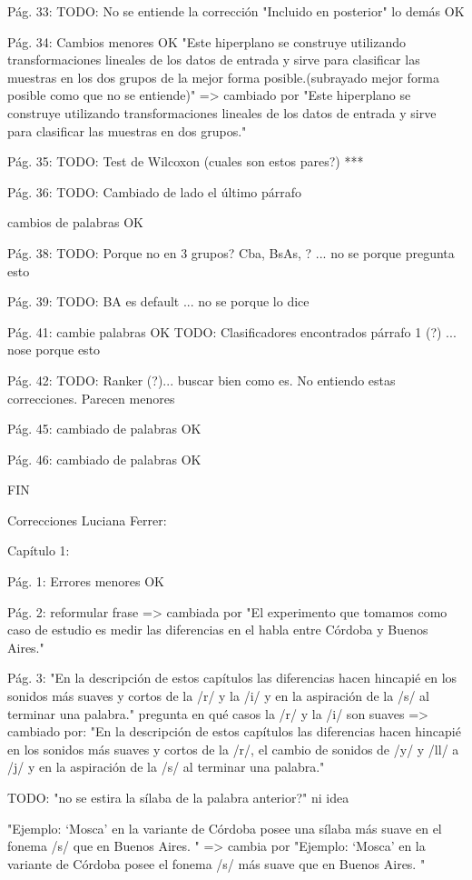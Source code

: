 Pág. 33: 
TODO: No se entiende la corrección "Incluido en posterior"
lo demás OK

Pág. 34:
Cambios menores OK
"Este hiperplano se construye utilizando transformaciones lineales de los datos de entrada y sirve para clasificar las muestras en los dos grupos de la mejor forma posible.(subrayado mejor forma posible como que no se entiende)" => cambiado por 
"Este hiperplano se construye utilizando transformaciones lineales de los datos de entrada y sirve para clasificar las muestras en dos grupos."

Pág. 35:
TODO: Test de Wilcoxon (cuales son estos pares?) ***

Pág. 36:
TODO: Cambiado de lado el último párrafo 

cambios de palabras OK

Pág. 38: 
TODO: Porque no en 3 grupos? Cba, BsAs, ? ... no se porque pregunta esto

Pág. 39: 
TODO: BA es default ... no se porque lo dice

Pág. 41: cambie palabras OK
TODO: Clasificadores encontrados párrafo 1 (?) ... nose porque esto

Pág. 42: 
TODO: Ranker (?)... buscar bien como es.
No entiendo estas correcciones. Parecen menores

Pág. 45:
cambiado de palabras OK

Pág. 46:
cambiado de palabras OK

FIN

Correcciones Luciana Ferrer: 

Capítulo 1:

Pág. 1:
Errores menores OK

Pág. 2:
reformular frase => cambiada por "El experimento que tomamos como caso de estudio es medir las diferencias en el habla entre Córdoba y Buenos Aires."

Pág. 3:
"En la descripción de estos capítulos las diferencias hacen hincapié en los sonidos más suaves y cortos de la /r/ y la /i/ y en la aspiración de la /s/ al terminar una palabra." pregunta en qué casos la /r/ y la /i/ son suaves => cambiado por:
"En la descripción de estos capítulos las diferencias hacen hincapié en los sonidos más suaves y cortos de la /r/, el cambio de sonidos de /y/ y /ll/ a  /j/ y en la aspiración de la /s/ al terminar una palabra."

TODO: "no se estira la sílaba de la palabra anterior?" ni idea 

"Ejemplo: `Mosca' en la variante de Córdoba posee una sílaba más suave en el fonema /s/ que en Buenos Aires. " => cambia por
"Ejemplo: `Mosca' en la variante de Córdoba posee el fonema /s/ más suave que en Buenos Aires. "
